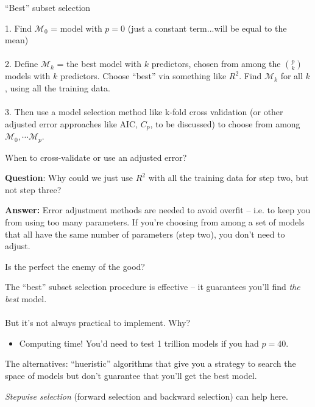 \documentclass[mathserif, aspectratio=169]{beamer}
\begin{document}
\begin{frame}{``Best'' subset selection}

1. Find $\mathcal{M}_0$ = model with $p=0$ (just a constant term...will be equal to the mean)\\~\\

2. Define $\mathcal{M}_k$ = the best model with $k$ predictors, chosen from among the $p\choose{k}$ models with $k$ predictors.  Choose ``best'' via something like $R^2$.  Find $\mathcal{M}_k$ for all $k$, using all the training data.\\~\\

3. Then use a model selection method like k-fold cross validation (or other adjusted error approaches like AIC, $C_p$, to be discussed) to choose from among $\mathcal{M}_0,\cdots\mathcal{M}_p$.

\end{frame}

\begin{frame}{When to cross-validate or use an adjusted error?}

\textbf{Question}:  Why could we just use $R^2$ with all the training data for step two, but not step three?

\vspace*{3mm}

\pause
\textbf{Answer:} Error adjustment methods are needed to avoid overfit -- i.e. to keep you from using too many parameters.  If you're choosing from among a set of models that all have the same number of parameters (step two), you don't need to adjust.

\end{frame}


\begin{frame}{Is the perfect the enemy of the good?}

The ``best'' subset selection procedure is effective -- it guarantees you'll find \textit{the best} model.\\~\\

But it's not always practical to implement.  Why?

\pause

\begin{itemize}
\item Computing time!  You'd need to test 1 trillion models if you had $p=40$.
\end{itemize}

The alternatives: ``hueristic'' algorithms that give you a strategy to search the space of models but don't guarantee that you'll get the best model.  

\vspace{5mm}

\textit{Stepwise selection} (forward selection and backward selection) can help here.
\end{frame}
\end{document}
